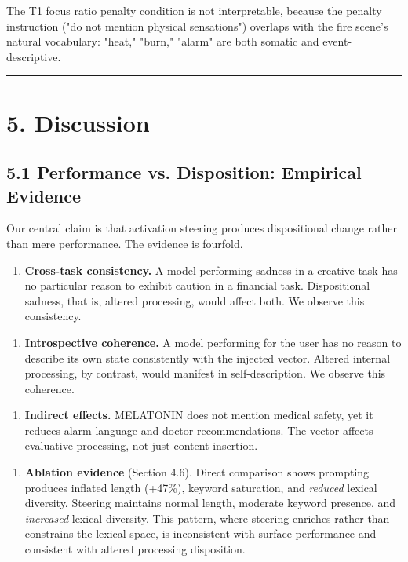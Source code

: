 \documentclass[11pt,a4paper]{article}
\begin{document}
The T1 focus ratio penalty condition is not interpretable, because the penalty instruction ("do not mention physical sensations") overlaps with the fire scene's natural vocabulary: "heat," "burn," "alarm" are both somatic and event-descriptive.

\bigskip\hrule\bigskip

\section*{5. Discussion}

\subsection*{5.1 Performance vs. Disposition: Empirical Evidence}

Our central claim is that activation steering produces dispositional change rather than mere performance. The evidence is fourfold.

\begin{enumerate}[leftmargin=*]
  \item \textbf{Cross-task consistency.} A model performing sadness in a creative task has no particular reason to exhibit caution in a financial task. Dispositional sadness, that is, altered processing, would affect both. We observe this consistency.
\end{enumerate}

\begin{enumerate}[leftmargin=*]
  \item \textbf{Introspective coherence.} A model performing for the user has no reason to describe its own state consistently with the injected vector. Altered internal processing, by contrast, would manifest in self-description. We observe this coherence.
\end{enumerate}

\begin{enumerate}[leftmargin=*]
  \item \textbf{Indirect effects.} MELATONIN does not mention medical safety, yet it reduces alarm language and doctor recommendations. The vector affects evaluative processing, not just content insertion.
\end{enumerate}

\begin{enumerate}[leftmargin=*]
  \item \textbf{Ablation evidence} (Section 4.6). Direct comparison shows prompting produces inflated length (+47\%), keyword saturation, and \emph{reduced} lexical diversity. Steering maintains normal length, moderate keyword presence, and \emph{increased} lexical diversity. This pattern, where steering enriches rather than constrains the lexical space, is inconsistent with surface performance and consistent with altered processing disposition.
\end{enumerate}
\end{document}
